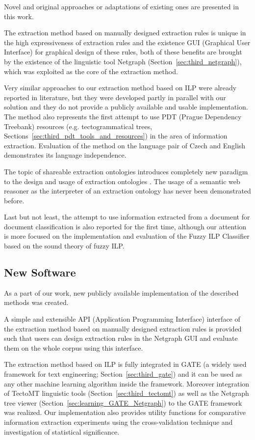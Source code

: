 Novel and original approaches or adaptations of existing ones are presented in this work.

The extraction method based on manually designed extraction rules is unique in the high expressiveness of extraction rules and the existence GUI (Graphical User Interface) for graphical design of these rules, both of these benefits are brought by the existence of the linguistic tool Netgraph (Section~\ref{sec:third_netgraph}), which was exploited as the core of the extraction method.

Very similar approaches to our extraction method based on ILP were already reported in literature, but they were developed partly in parallel with our solution and they do not provide a publicly available and usable implementation. The method also represents the first attempt to use PDT (Prague Dependency Treebank) resources (e.g. tectogrammatical trees, Sections~\ref{sec:third_pdt_tools_and_resources}) in the area of information extraction. Evaluation of the method on the language pair of Czech and English demonstrates its language independence.

The topic of shareable extraction ontologies introduces completely new paradigm to the design and usage of extraction ontologies \citep{DBLP:conf/er/EmbleyTL02}. The usage of a semantic web reasoner as the interpreter of an extraction ontology has never been demonstrated before.

Last but not least, the attempt to use information extracted from a document for document classification is also reported for the first time, although our attention is more focused on the implementation and evaluation of the Fuzzy ILP Classifier based on the sound theory of fuzzy ILP.



\subsection{New Software}

As a part of our work, new publicly available implementation of the described methods was created. 

A simple and extensible API (Application Programming Interface) interface of the extraction method based on manually designed extraction rules is provided such that users can design extraction rules in the Netgraph GUI and evaluate them on the whole corpus using this interface. 

The extraction method based on ILP is fully integrated in GATE (a widely used framework for text engineering; Section~\ref{sec:third_gate}) and it can be used as any other machine learning algorithm inside the framework. Moreover integration of TectoMT linguistic tools (Section~\ref{sec:third_tectomt}) as well as the Netgraph tree viewer (Section~\ref{sec:learning_GATE_Netgraph}) to the GATE framework was realized. Our implementation also provides utility functions for  comparative information extraction experiments using the cross-validation technique and investigation of statistical significance. 

